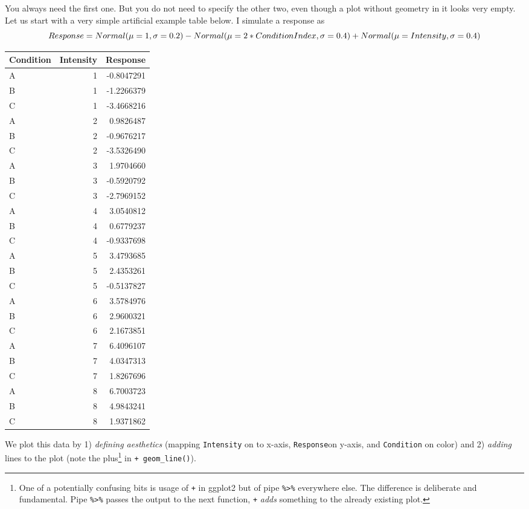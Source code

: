 \documentclass[
]{book}
\begin{document}
You always need the first one. But you do not need to specify the other two, even though a plot without geometry in it looks very empty. Let us start with a very simple artificial example table below. I simulate a response as
\[Response = Normal(\mu=1, \sigma=0.2) - \\Normal(\mu=2*ConditionIndex, \sigma=0.4) + \\Normal(\mu=Intensity, \sigma=0.4)\]

\begin{tabular}{l|r|r}
\hline
Condition & Intensity & Response\\
\hline
A & 1 & -0.8047291\\
\hline
B & 1 & -1.2266379\\
\hline
C & 1 & -3.4668216\\
\hline
A & 2 & 0.9826487\\
\hline
B & 2 & -0.9676217\\
\hline
C & 2 & -3.5326490\\
\hline
A & 3 & 1.9704660\\
\hline
B & 3 & -0.5920792\\
\hline
C & 3 & -2.7969152\\
\hline
A & 4 & 3.0540812\\
\hline
B & 4 & 0.6779237\\
\hline
C & 4 & -0.9337698\\
\hline
A & 5 & 3.4793685\\
\hline
B & 5 & 2.4353261\\
\hline
C & 5 & -0.5137827\\
\hline
A & 6 & 3.5784976\\
\hline
B & 6 & 2.9600321\\
\hline
C & 6 & 2.1673851\\
\hline
A & 7 & 6.4096107\\
\hline
B & 7 & 4.0347313\\
\hline
C & 7 & 1.8267696\\
\hline
A & 8 & 6.7003723\\
\hline
B & 8 & 4.9843241\\
\hline
C & 8 & 1.9371862\\
\hline
\end{tabular}

We plot this data by 1) \emph{defining aesthetics} (mapping \texttt{Intensity} on to x-axis, \texttt{Response}on y-axis, and \texttt{Condition} on color) and 2) \emph{adding} lines to the plot (note the plus\footnote{One of a potentially confusing bits is usage of \texttt{+} in ggplot2 but of pipe \texttt{\%\textgreater{}\%} everywhere else. The difference is deliberate and fundamental. Pipe \texttt{\%\textgreater{}\%} passes the output to the next function, \texttt{+} \emph{adds} something to the already existing plot.} in \texttt{+\ geom\_line()}).
\end{document}
